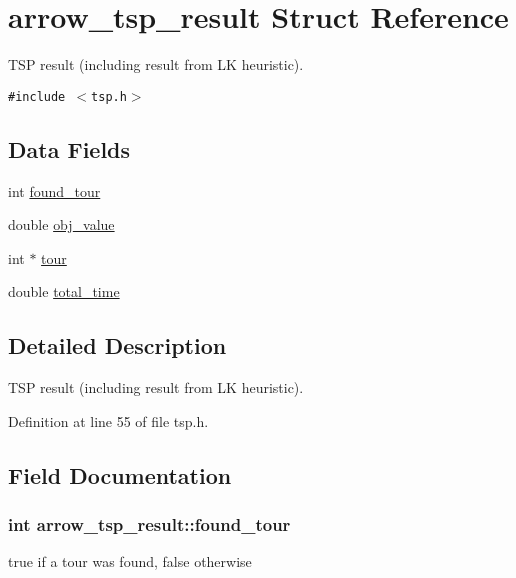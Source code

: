 \hypertarget{structarrow__tsp__result}{
\section{arrow\_\-tsp\_\-result Struct Reference}
\label{structarrow__tsp__result}
}
TSP result (including result from LK heuristic).  


{\tt \#include $<$tsp.h$>$}

\subsection*{Data Fields}
\begin{CompactItemize}
\item 
int \hyperlink{structarrow__tsp__result_b85143df6ecc70032db7411a1aa3192a}{found\_\-tour}
\item 
double \hyperlink{structarrow__tsp__result_f0fae9756e4c924517addf05988cfcb9}{obj\_\-value}
\item 
int $\ast$ \hyperlink{structarrow__tsp__result_48433b03146d6ca3423a555ea2139d52}{tour}
\item 
double \hyperlink{structarrow__tsp__result_82ea7aa0320d932892602d34339a9276}{total\_\-time}
\end{CompactItemize}


\subsection{Detailed Description}
TSP result (including result from LK heuristic). 

Definition at line 55 of file tsp.h.

\subsection{Field Documentation}
\hypertarget{structarrow__tsp__result_b85143df6ecc70032db7411a1aa3192a}{
\subsubsection{\setlength{\rightskip}{0pt plus 5cm}int {\bf arrow\_\-tsp\_\-result::found\_\-tour}}}
\label{structarrow__tsp__result_b85143df6ecc70032db7411a1aa3192a}


true if a tour was found, false otherwise 

